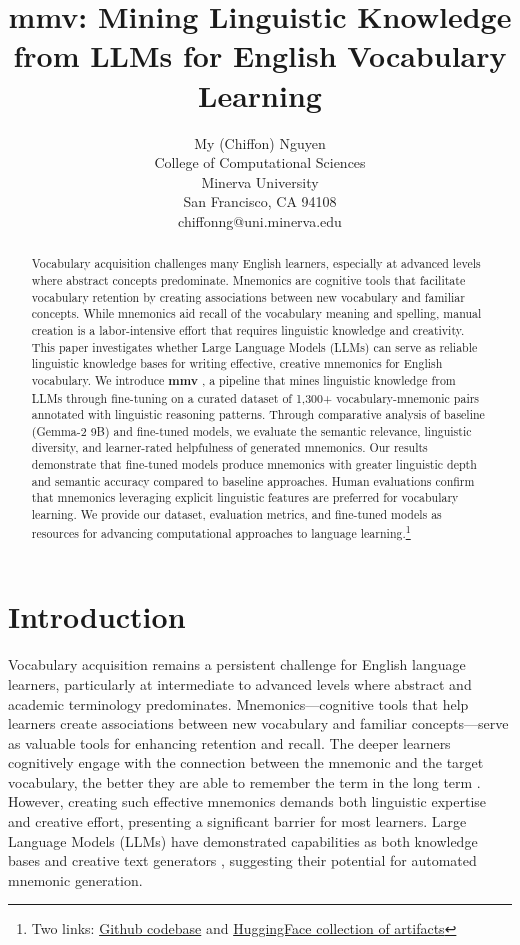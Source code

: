 \documentclass{article}
\title{mmv: Mining Linguistic Knowledge from LLMs for English Vocabulary Learning}
\author{%
  My (Chiffon) Nguyen \\
  College of Computational Sciences \\
  Minerva University \\
  San Francisco, CA 94108 \\
  chiffonng@uni.minerva.edu
}
\newcounter{para}
\newcommand{\shorttitle}{\textbf{mmv }}
\begin{document}
\maketitle

\begin{abstract}
Vocabulary acquisition challenges many English learners, especially at advanced levels where abstract concepts predominate. Mnemonics are cognitive tools that facilitate vocabulary retention by creating associations between new vocabulary and familiar concepts.
While mnemonics aid recall of the vocabulary meaning and spelling, manual creation is a labor-intensive effort that requires linguistic knowledge and creativity. This paper investigates whether Large Language Models (LLMs) can serve as reliable linguistic knowledge bases for writing effective, creative mnemonics for English vocabulary. We introduce \shorttitle, a pipeline that mines linguistic knowledge from LLMs through fine-tuning on a curated dataset of 1,300+ vocabulary-mnemonic pairs annotated with linguistic reasoning patterns. Through comparative analysis of baseline (Gemma-2 9B) and fine-tuned models, we evaluate the semantic relevance, linguistic diversity, and learner-rated helpfulness of generated mnemonics. Our results demonstrate that fine-tuned models produce mnemonics with greater linguistic depth and semantic accuracy compared to baseline approaches. Human evaluations confirm that mnemonics leveraging explicit linguistic features are preferred for vocabulary learning. We provide our dataset, evaluation metrics, and fine-tuned models as resources for advancing computational approaches to language learning.\footnote{Two links: \href{https://github.com/chiffonng/mnemonic-gen}{Github codebase} and \href{https://huggingface.co/collections/chiffonng/vocab-mnemonic-mining-67563a0a1ab91e84e9827579}{HuggingFace collection of artifacts}}
\end{abstract}

\section{Introduction} \label{sec:intro}
Vocabulary acquisition remains a persistent challenge for English language learners, particularly at intermediate to advanced levels where abstract and academic terminology predominates. Mnemonics—cognitive tools that help learners create associations between new vocabulary and familiar concepts—serve as valuable tools for enhancing retention and recall. The deeper learners cognitively engage with the connection between the mnemonic and the target vocabulary, the better they are able to remember the term in the long term \citep{atkinson1975mnemotechnics}. However, creating such effective mnemonics demands both linguistic expertise and creative effort, presenting a significant barrier for most learners. Large Language Models (LLMs) have demonstrated capabilities as both knowledge bases \citep{petroni2019language, roberts2020much} and creative text generators \citep{brown2020language}, suggesting their potential for automated mnemonic generation.
\end{document}
